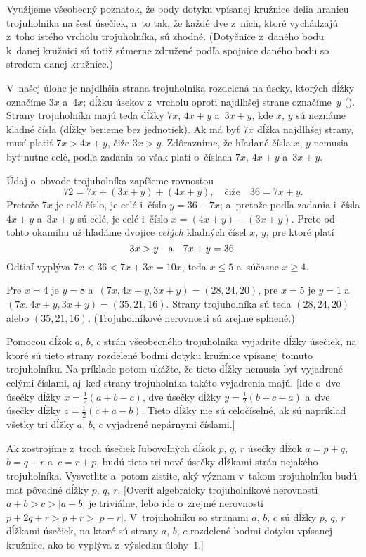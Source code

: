 {%
Využijeme všeobecný poznatok, že body dotyku vpísanej kružnice delia
hranicu trojuholníka na šesť úsečiek, a~to tak, že každé dve z~nich, ktoré
vychádzajú z~toho istého vrcholu trojuholníka, sú zhodné. (Dotyčnice z~daného
bodu k~danej kružnici sú totiž súmerne združené podľa spojnice
daného bodu so stredom danej kružnice.)

V~našej úlohe je najdlhšia strana trojuholníka rozdelená na úseky,
ktorých dĺžky označíme $3x$ a~$4x$; dĺžku úsekov
z~vrcholu oproti najdlhšej strane označíme~$y$ (\obr). Strany
trojuholníka majú teda dĺžky $7x$, $4x+y$ a~$3x+y$, kde $x$, $y$ sú neznáme
kladné čísla (dĺžky berieme bez jednotiek).
Ak má byť $7x$ dĺžka najdlhšej strany, musí platiť $7x>4x+y$,
čiže  $3x>y$. Zdôraznime, že hľadané čísla $x$, $y$ nemusia byť
nutne celé, podľa zadania to však platí o~číslach $7x$, $4x+y$ a~$3x+y$.
%

Údaj o~obvode trojuholníka zapíšeme rovnosťou
$$
72=7x+(3x+y)+(4x+y),\quad\text{čiže}\quad 36=7x+y.
$$
Pretože $7x$ je celé číslo, je celé i~číslo
$y=36-7x$; a~pretože podľa zadania i~čísla $4x+y$
a~$3x+y$ sú celé, je celé i~číslo $x=(4x+y)-(3x+y)$.
Preto od tohto okamihu už hľadáme dvojice {\it celých\/} kladných čísel $x$, $y$,
pre ktoré platí
$$
3x>y\quad\hbox{a}\quad 7x+y=36.
$$
Odtiaľ vyplýva $7x<36<7x+3x=10x$, teda $x\le5$
a~súčasne $x\ge4$.

Pre $x=4$ je $y=8$
a~$(7x,4x+y,3x+y)=(28,24,20)$, pre $x=5$ je $y=1$
a~$(7x,4x+y,3x+y)=(35,21,16)$. Strany trojuholníka sú teda $(28,24,20)$
alebo $(35,21,16)$. (Trojuholníkové nerovnosti sú zrejme splnené.)

Pomocou dĺžok $a$, $b$, $c$ strán všeobecného trojuholníka
vyjadrite dĺžky úsečiek, na ktoré sú tieto strany rozdelené bodmi
dotyku kružnice vpísanej tomuto trojuholníku. Na
príklade potom ukážte, že tieto dĺžky nemusia byť vyjadrené celými číslami,
aj~keď strany trojuholníka takéto vyjadrenia majú. [Ide o~dve úsečky dĺžky $x=\frac12(a+b-c)$, dve úsečky dĺžky
$y=\frac12(b+c-a)$ a~dve úsečky dĺžky $z=\frac12(c+a-b)$. Tieto
dĺžky nie sú celočíselné, ak sú napríklad všetky tri dĺžky
$a$, $b$, $c$ vyjadrené nepárnymi číslami.]

Ak zostrojíme z~troch úsečiek ľubovoľných dĺžok $p$, $q$, $r$
úsečky dĺžok $a=p+q$, $b=q+r$ a~$c=r+p$, budú tieto
tri nové úsečky dĺžkami strán nejakého trojuholníka.
Vysvetlite a~potom zistite, aký význam v~takom
trojuholníku budú mať pôvodné dĺžky $p$, $q$, $r$. [Overiť algebraicky
trojuholníkové nerovnosti $a+b>c>|a-b|$ je triviálne, lebo ide o~zrejmé
nerovnosti $p+2q+r>p+r>|p-r|$. V~trojuholníku so stranami
$a$, $b$, $c$ sú dĺžky $p$, $q$, $r$ dĺžkami úsečiek, na ktoré
sú strany $a$, $b$, $c$ rozdelené bodmi dotyku vpísanej kružnice,
ako to vyplýva z~výsledku úlohy~1.]

}
